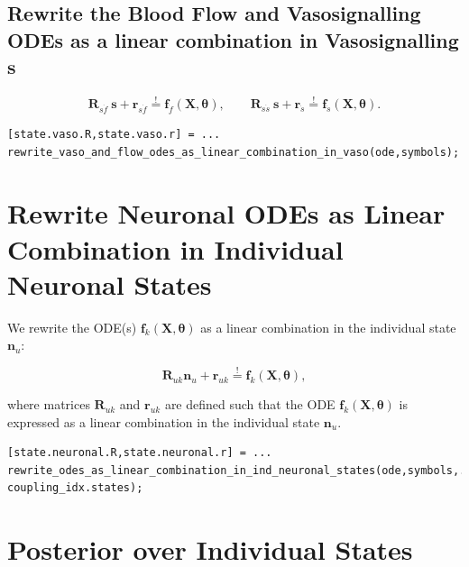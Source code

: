 \begin{par}
\subsection{Rewrite the Blood Flow and Vasosignalling ODEs as a linear combination in Vasosignalling $\mathbf{s}$}
    
$$\mathbf{R}_{s\dot{f}} ~\mathbf{s} + \mathbf{r}_{s\dot{f}}
\stackrel{!}{=} \mathbf{f}_{\dot{f}}(\mathbf{X},\boldsymbol\theta), \qquad \mathbf{R}_{s\dot{s}}~ \mathbf{s} + \mathbf{r}_{ \dot{s}} \stackrel{!}{=} \mathbf{f}_{\dot{s}}(\mathbf{X},\boldsymbol\theta).$$
    \color{RoyalPurple}\begin{verbatim}
[state.vaso.R,state.vaso.r] = ...
rewrite_vaso_and_flow_odes_as_linear_combination_in_vaso(ode,symbols);
\end{verbatim} 
\color{black}


\section{Rewrite Neuronal ODEs as Linear Combination in Individual Neuronal States}

\begin{par}
We rewrite the ODE(s) $\mathbf{f}_k(\mathbf{X},\boldsymbol\theta)$ as a linear combination in the individual state $\mathbf{n}_u$:
\end{par} \vspace{1em}

$$\mathbf{R}_{uk}  \mathbf{n}_u + \mathbf{r}_{uk} \stackrel{!}{=}
\mathbf{f}_{k}(\mathbf{X},\boldsymbol\theta),$$
    \begin{par}
where matrices $\mathbf{R}_{uk}$ and $\mathbf{r}_{uk}$ are defined such that the ODE $\mathbf{f}_k(\mathbf{X},\boldsymbol\theta)$ is expressed as a linear combination in the individual state $\mathbf{n}_u$.
\end{par} \vspace{1em}

\color{RoyalPurple}\begin{verbatim}
[state.neuronal.R,state.neuronal.r] = ...
rewrite_odes_as_linear_combination_in_ind_neuronal_states(ode,symbols,...
coupling_idx.states);
\end{verbatim} 
\end{par}


\section{Posterior over Individual States}

